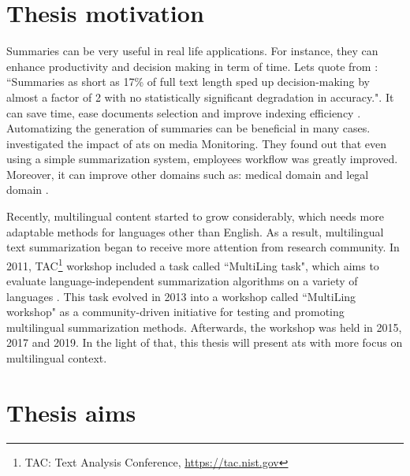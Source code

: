 \section{Thesis motivation}


Summaries can be very useful in real life applications.
For instance, they can enhance productivity and decision making in term of time.
Lets quote from \citep{02-mani-al}: ``Summaries as short as 17\% of full text length sped up decision-making by almost a factor of 2 with no statistically significant degradation in accuracy.".
It can save time, ease documents selection and improve indexing efficiency \citet{75-borko-bernier}.
Automatizing the generation of summaries can be beneficial in many cases. 
\citep{17-pashutan-al} investigated the impact of \ac{ats} on media Monitoring. 
They found out that even using a simple summarization system, employees workflow was greatly improved.
Moreover, it can improve other domains such as: medical domain \citep{05-afantenos-al,19-liang-al} and legal domain \citep{04-farzindar-lapalme,16-polsley-al}.

Recently, multilingual content started to grow considerably, which needs more adaptable methods for languages other than English.
As a result, multilingual text summarization began to receive more attention from research community. 
In 2011, TAC\footnote{TAC: Text Analysis Conference, \url{https://tac.nist.gov}} workshop included a task called ``MultiLing task", which aims to evaluate language-independent summarization algorithms on a variety of languages \citep{11-giannakopoulos-al}.
This task evolved in 2013 into a workshop called ``MultiLing workshop" as a community-driven initiative for testing and promoting multilingual summarization methods. 
Afterwards, the workshop was held in 2015, 2017 and 2019. 
In the light of that, this thesis will present \ac{ats} with more focus on multilingual context.


\section{Thesis aims}

